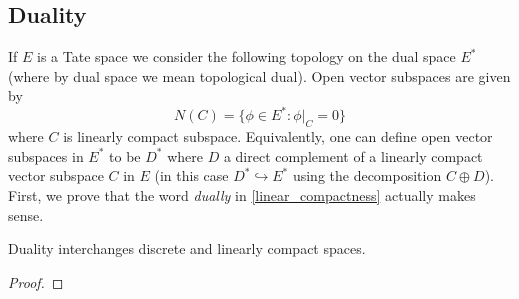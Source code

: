 \subsection*{Duality}
If $E$ is a Tate space we consider the following topology on the dual space $E^{*}$ (where by dual space we mean topological dual). Open vector subspaces are given by
\[
	N(C) = \{\phi\in E^{*} \colon \phi\lvert_{C} = 0\}
\]
where $C$ is linearly compact subspace. Equivalently, one can define open vector subspaces in $E^{*}$ to be $D^{*}$ where $D$ a direct complement of a linearly compact vector subspace $C$ in $E$ (in this case $D^{*} \hookrightarrow E^{*}$ using the decomposition $C\oplus D$).  \\
First, we prove that the word \emph{dually} in \cref{linear_compactness} actually makes sense. 
\begin{proposition}\label{duality-d-lattice-c-lattice}
	Duality interchanges discrete and linearly compact spaces.
\end{proposition}
\begin{proof}
	
\end{proof}


